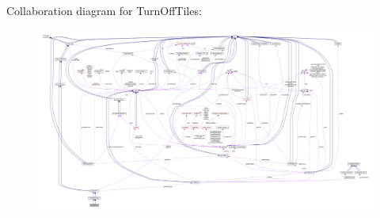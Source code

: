 Collaboration diagram for Turn\+Off\+Tiles\+:
\nopagebreak
\begin{figure}[H]
\begin{center}
\leavevmode
\includegraphics[width=350pt]{classTurnOffTiles__coll__graph}
\end{center}
\end{figure}
